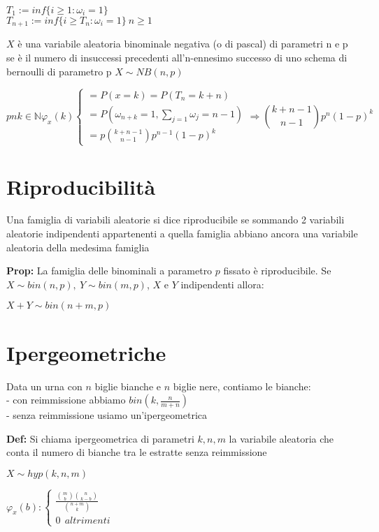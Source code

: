 \documentclass[11pt, letterpaper]{article}
\begin{document}
$T_{1}:=inf\{i\geq 1: \omega_{i}=1\}$\\
$T_{n+1}:=inf\{i\geq T_{n}: \omega_{i}=1\}\ n\geq 1$

$X$ è una variabile aleatoria binominale negativa (o di pascal) di parametri n e p se è il numero di insuccessi precedenti
all'n-ennesimo successo di uno schema di bernoulli di parametro p $X\sim NB(n,p)$

\begin{equation}
    pn k\in\mathbb{N} \varphi_{x}(k)
    \begin{cases}
        = P(x=k)=P(T_{n}=k+n)\\
        = P(\omega_{n+k}=1,\sum_{j=1}\omega_{j}=n-1)\\
        = p \binom{k+n-1}{n-1} p^{n-1}(1-p)^{k} 
    \end{cases}    
    \Rightarrow \binom{k+n-1}{n-1} p^{n}(1-p)^{k} 
\end{equation}

\newpage
\section{Riproducibilità}
Una famiglia di variabili aleatorie si dice riproducibile se sommando 2 variabili aleatorie indipendenti appartenenti
a quella famiglia abbiano ancora una variabile aleatoria della medesima famiglia

\textbf{Prop:} La famiglia delle binominali a parametro $p$ fissato è riproducibile. Se $X\sim bin(n,p),\ 
Y\sim bin(m,p)$, $X$ e $Y$ indipendenti allora:
\begin{center}
    $X+Y\sim bin(n+m,p)$
\end{center}

\section{Ipergeometriche}
Data un urna con $n$ biglie bianche e $n$ biglie nere, contiamo le bianche:\\
- con reimmissione abbiamo $bin(k,\frac{n}{m+n})$\\
- senza reimmissione usiamo un'ipergeometrica

\textbf{Def:} Si chiama ipergeometrica di parametri $k,n,m$ la variabile aleatoria che conta il numero di bianche
tra le estratte senza reimmissione
\begin{center}
    $X\sim hyp(k,n,m)$
\end{center}

$\varphi_{x}(b):
\begin{cases}
    \frac{\binom{m}{b}\binom{n}{k-b}}{\binom{n+m}{k}}\\
    0\ \ altrimenti
\end{cases}$
\end{document}
